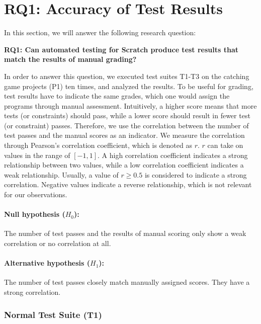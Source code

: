 \section{RQ1: Accuracy of Test Results}
\label{sec:rq1}

In this section, we will answer the following research question:

\begin{center}\begin{minipage}{.9\textwidth}
    \textbf{RQ1: Can automated testing for Scratch produce test results that match the results of manual grading?}
\end{minipage}\end{center}

\noindent In order to answer this question,
we executed test suites T1-T3 on the catching game projects (P1) ten times,
and analyzed the results.
To be useful for grading,
test results have to indicate the same grades,
which one would assign the programs through manual assessment.
Intuitively, a higher score means that more tests (or constraints) should pass,
while a lower score should result in fewer test (or constraint) passes.
Therefore, we use the correlation between the number of test passes and the manual scores as an indicator.
We measure the correlation through Pearson's correlation coefficient, which is denoted as $r$.
$r$ can take on values in the range of $[-1, 1]$.
A high correlation coefficient indicates a strong relationship between two values,
while a low correlation coefficient indicates a weak relationship.
Usually, a value of $r \ge 0.5$ is considered to indicate a strong correlation.
Negative values indicate a reverse relationship, which is not relevant for our observations.

\paragraph{Null hypothesis ($H_0$):}
The number of test passes and the results of manual scoring only show a weak correlation or no correlation at all.
\vspace{-\medskipamount}
\paragraph{Alternative hypothesis ($H_1$):}
The number of test passes closely match manually assigned scores.
They have a strong correlation.

\subsubsection{Normal Test Suite (T1)}

